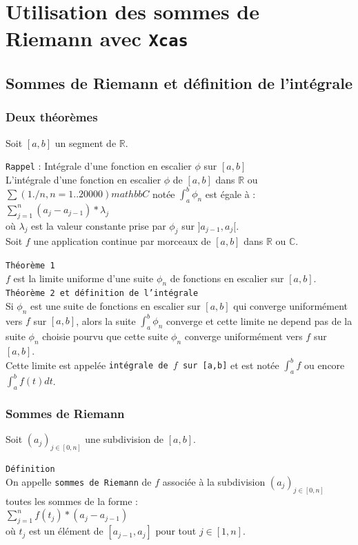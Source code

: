 \documentclass[a4paper,11pt]{book}
\begin{document}
\chapter{Utilisation des sommes de Riemann avec {\tt Xcas}}
\section{Sommes de Riemann et d\'efinition de l'int\'egrale}
\subsection{Deux th\'eor\`emes}
Soit $[a,b]$ un segment de $\mathbb R$. 

{\tt Rappel} : Int\'egrale d'une fonction en escalier $\phi$ sur $[a,b]$\\
L'int\'egrale d'une fonction en escalier $\phi$ de $[a,b]$
dans $\mathbb R$ ou $\sum(1./n,n=1..20000)mathbb C$ not\'ee
$\int_a^b \phi_n$ est \'egale \`a :\\
$\sum_{j=1}^n (a_j -a_{j-1})*\lambda_j$ \\
o\`u $\lambda_j$ est la valeur 
constante prise par $\phi_j $ sur $]a_{j-1},a_{j}[$.\\

Soit $f$ une application continue par 
morceaux de $[a,b]$ dans $\mathbb R$ ou $\mathbb C$.

{\tt Th\'eor\`eme 1}\\
$f$ est la limite uniforme d'une suite $\phi_n$ de fonctions en escalier sur 
$[a,b]$.\\

{\tt Th\'eor\`eme 2 et d\'efinition de l'int\'egrale}\\
Si $\phi_n$ est une suite de fonctions en escalier sur $[a,b]$ qui converge 
uniform\'ement vers $f$ sur $[a,b]$, alors la suite $\int_a^b \phi_n$ 
converge et cette limite ne depend pas de la suite $\phi_n$ choisie pourvu 
que cette suite $\phi_n$ converge uniform\'ement vers $f$ sur $[a,b]$.\\
Cette limite est appel\'ee {\tt int\'egrale de $f$ sur [a,b]} et est not\'ee
$\int_a^b f$ ou encore  $\int_a^b f(t) dt$.
\subsection{Sommes de Riemann}
Soit $(a_j)_{j \in [0,n]}$ une subdivision de $[a,b]$.

{\tt D\'efinition}\\
On appelle {\tt sommes de Riemann} de $f$ associ\'ee \`a la subdivision 
$(a_j)_{j \in [0,n]}$ toutes les sommes de la forme :\\
$\sum_{j=1}^n f(t_j)*(a_j-a_{j-1})$ \\
o\`u $t_j$ est un \'el\'ement de 
$[a_{j-1},a_{j}]$ pour tout $j \in [1,n]$.\\
\end{document}
